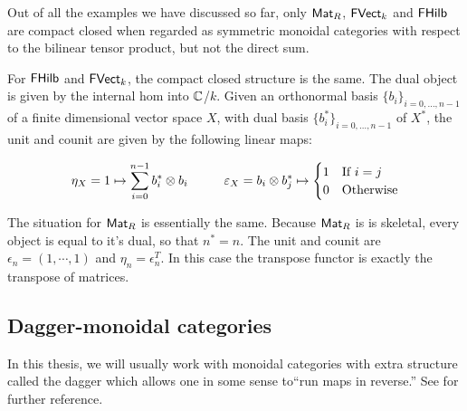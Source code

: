 \begin{example}
Out of all the examples we have discussed so far, only $\Mat_R$, $\FVect_k$ and $\FHilb$ are compact closed when regarded as symmetric monoidal categories with respect to the bilinear tensor product, but not the direct sum.

For $\FHilb$ and $\FVect_k$, the compact closed structure is the same.  The dual object is given by the internal hom into $\C$/$k$.  Given an orthonormal basis $\{ b_i \}_{i=0,\ldots, n-1}$ of a finite dimensional vector space $X$, with dual basis $\{b_i^* \}_{i=0,\ldots, n-1}$ of $X^*$, the unit and counit are given by the following linear maps:

$$
\eta_X = 1 \mapsto \sum_{i=0}^{n-1} b_i^* \otimes b_i \hspace*{1cm}\epsilon_X = b_i\otimes b_j^* \mapsto 
\begin{cases}
1 & \text{If $i=j$}\\
0 & \text {Otherwise}
\end{cases}
$$



The situation for $\Mat_R$ is essentially the same.
Because $\Mat_R$ is is skeletal, every object is equal to it's dual, so that $n^*=n$.
The unit and counit are $\epsilon_n=(1,\cdots, 1)$ and  $\eta_n=\epsilon_n^T$.  In this case the transpose functor is exactly the transpose of matrices. 
\end{example}






\subsection{Dagger-monoidal categories}
In this thesis, we will usually work with monoidal categories with extra structure called the dagger which allows one in some sense to``run maps in reverse.'' See \cite{cpm,abramsky} for further reference.


